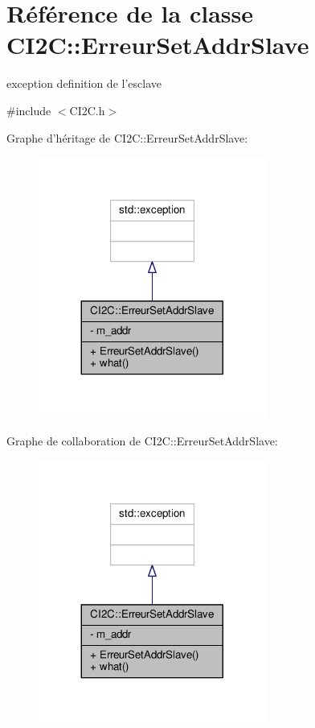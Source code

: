 \hypertarget{classCI2C_1_1ErreurSetAddrSlave}{\section{Référence de la classe C\+I2\+C\+:\+:Erreur\+Set\+Addr\+Slave}
\label{classCI2C_1_1ErreurSetAddrSlave}
}


exception definition de l'esclave  




{\ttfamily \#include $<$C\+I2\+C.\+h$>$}



Graphe d'héritage de C\+I2\+C\+:\+:Erreur\+Set\+Addr\+Slave\+:\nopagebreak
\begin{figure}[H]
\begin{center}
\leavevmode
\includegraphics[width=212pt]{classCI2C_1_1ErreurSetAddrSlave__inherit__graph}
\end{center}
\end{figure}


Graphe de collaboration de C\+I2\+C\+:\+:Erreur\+Set\+Addr\+Slave\+:\nopagebreak
\begin{figure}[H]
\begin{center}
\leavevmode
\includegraphics[width=212pt]{classCI2C_1_1ErreurSetAddrSlave__coll__graph}
\end{center}
\end{figure}
